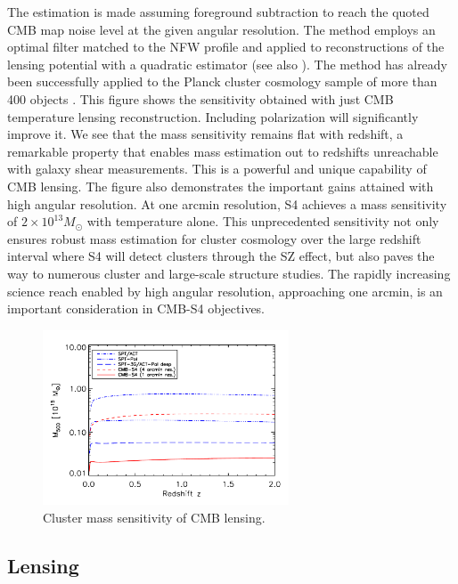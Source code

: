 	The estimation is made assuming foreground subtraction to reach the quoted CMB map noise level at the given angular resolution.  The method 
	\cite{Melin:2014uaa}  employs an optimal filter matched to the NFW profile and applied to reconstructions of the lensing potential with a quadratic estimator
	\cite{Hu:2001kj} (see also \cite{Madhavacheril:2014slf,Baxter:2014frs}).  The method has already been successfully applied to the Planck cluster cosmology sample of more than 400 objects 
	\cite{Ade:2013ydc}.  This figure shows the sensitivity obtained with just CMB temperature lensing reconstruction.  Including polarization will significantly improve it.  
	We see that the mass sensitivity remains flat with redshift, a remarkable property that enables mass estimation out to redshifts unreachable with galaxy shear measurements.  This is a powerful and unique capability of CMB lensing.  The figure also demonstrates the important gains attained with high angular resolution.  At one arcmin resolution, S4 achieves a mass sensitivity of $2 \times 10^{13}M_\odot$ with temperature alone.  This unprecedented sensitivity not only ensures robust mass estimation for cluster cosmology over the large redshift interval where S4 will detect clusters through the SZ effect, but also paves the way to numerous cluster and large-scale structure studies.  The rapidly increasing science reach enabled by high angular resolution, approaching one arcmin, is an important consideration in CMB-S4 objectives.  

\begin{figure}[t!]
\begin{center}
\includegraphics[width=0.65\textwidth]{DarkEnergy/m500lim_vs_z_1sigma_cmbs4_v1.pdf}
\caption{Cluster mass sensitivity of CMB lensing.}
\label{fig:limits}
\end{center}
\end{figure} 

\subsection{Lensing}

